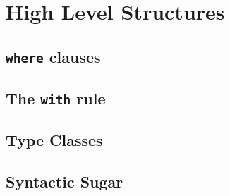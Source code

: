 \section{High Level Structures}

\subsection{\texttt{where} clauses}

\subsection{The \texttt{with} rule}

\subsection{Type Classes}

\subsection{Syntactic Sugar}

